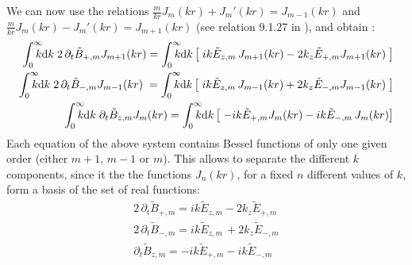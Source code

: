 We can now use the relations $\frac{m}{kr} J_m(kr) +
    J_m'(kr) = J_{m-1}(kr)$ and $\frac{m}{kr} J_m(kr) -
    J_m'(kr) = J_{m+1}(kr)$ (see relation 9.1.27 in
    \cite{Abramowitz}), and obtain :
\begin{align*}
\RInteg{k} \; 2 \,\partial_t \tilde{B}_{+,m}  J_{m+1}(kr) =
\RInteg{k} \left[ \; ik\tilde{E}_{z,m}\,
    J_{m+1}(kr) -2 k_z\tilde{E}_{+,m}J_{m+1}(kr) \;
\right] \\
\RInteg{k} \; 2\, \partial_t \tilde{B}_{-,m}  J_{m-1}(kr) \; =
\RInteg{k} \left[ \;
   ik\tilde{E}_{z,m} \,
    J_{m-1}(kr) + 2k_z\tilde{E}_{-,m}J_{m-1}(kr) \;
\right] \\
\RInteg{k}\; \partial_t \tilde{B}_{z,m}  J_{m}(kr) =
\RInteg{k} \left[ \; -ik\tilde{E}_{+,m} J_{m}(kr) - ik\tilde{E}_{-,m}\,J_{m}(kr) \right] 
\end{align*}
Each equation of the above system contains Bessel functions of only one
given order (either $m+1$, $m-1$ or $m$). This allows to separate the
different $k$ components, since it the the functions $J_n(kr)$, for a
fixed $n$ different values of $k$, form a basis of the set of real functions:
\begin{align*}
2 \,\partial_t \tilde{B}_{+,m} =
ik\tilde{E}_{z,m} -2 k_z\tilde{E}_{+,m} \\
2\, \partial_t \tilde{B}_{-,m} = ik\tilde{E}_{z,m} \,
    + 2k_z\tilde{E}_{-,m} \\
 \partial_t \tilde{B}_{z,m} = -ik\tilde{E}_{+,m}  - ik\tilde{E}_{-,m}
\end{align*}

